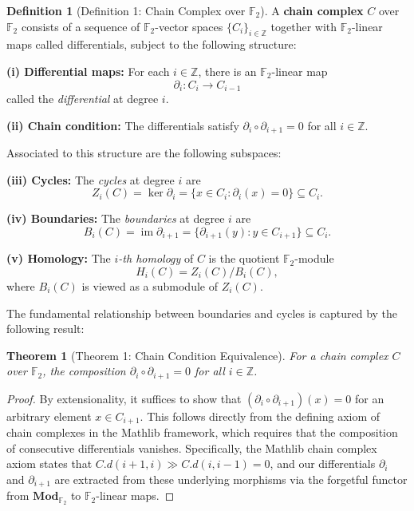 \documentclass[11pt]{article}
\theoremstyle{plain}
\newtheorem*{theorem}{Theorem}
\theoremstyle{definition}
\newtheorem*{definition}{Definition}
\theoremstyle{remark}
\renewcommand{\ker}{\operatorname{ker}}
\begin{document}
\begin{definition}[Definition 1: Chain Complex over $\mathbb{F}_2$]
A \textbf{chain complex} $C$ over $\mathbb{F}_2$ consists of a sequence of $\mathbb{F}_2$-vector spaces $\{C_i\}_{i \in \mathbb{Z}}$ together with $\mathbb{F}_2$-linear maps called differentials, subject to the following structure:

\textbf{(i) Differential maps:} For each $i \in \mathbb{Z}$, there is an $\mathbb{F}_2$-linear map
\[
\partial_i : C_i \to C_{i-1}
\]
called the \emph{differential} at degree $i$.

\textbf{(ii) Chain condition:} The differentials satisfy $\partial_i \circ \partial_{i+1} = 0$ for all $i \in \mathbb{Z}$.

Associated to this structure are the following subspaces:

\textbf{(iii) Cycles:} The \emph{cycles} at degree $i$ are
\[
Z_i(C) = \ker \partial_i = \{x \in C_i : \partial_i(x) = 0\} \subseteq C_i.
\]

\textbf{(iv) Boundaries:} The \emph{boundaries} at degree $i$ are
\[
B_i(C) = \operatorname{im} \partial_{i+1} = \{\partial_{i+1}(y) : y \in C_{i+1}\} \subseteq C_i.
\]

\textbf{(v) Homology:} The \emph{$i$-th homology} of $C$ is the quotient $\mathbb{F}_2$-module
\[
H_i(C) = Z_i(C) / B_i(C),
\]
where $B_i(C)$ is viewed as a submodule of $Z_i(C)$.
\end{definition}

The fundamental relationship between boundaries and cycles is captured by the following result:

\begin{theorem}[Theorem 1: Chain Condition Equivalence]
For a chain complex $C$ over $\mathbb{F}_2$, the composition $\partial_i \circ \partial_{i+1} = 0$ for all $i \in \mathbb{Z}$.
\end{theorem}

\begin{proof}
By extensionality, it suffices to show that $(\partial_i \circ \partial_{i+1})(x) = 0$ for an arbitrary element $x \in C_{i+1}$. This follows directly from the defining axiom of chain complexes in the Mathlib framework, which requires that the composition of consecutive differentials vanishes. Specifically, the Mathlib chain complex axiom states that $C.d(i+1,i) \gg C.d(i,i-1) = 0$, and our differentials $\partial_i$ and $\partial_{i+1}$ are extracted from these underlying morphisms via the forgetful functor from $\mathbf{Mod}_{\mathbb{F}_2}$ to $\mathbb{F}_2$-linear maps.
\end{proof}
\end{document}
